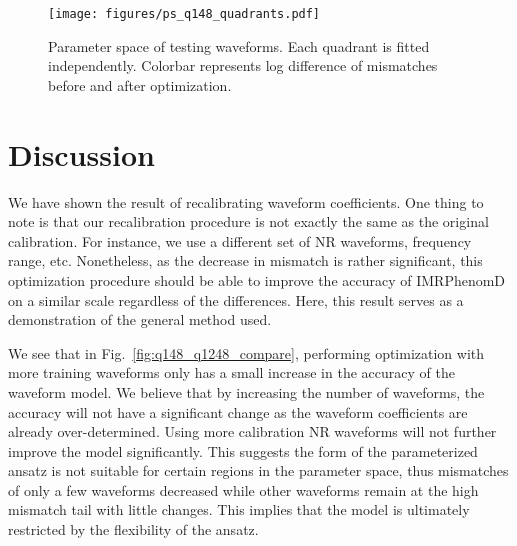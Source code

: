 \documentclass[twocolumn]{aastex631}
\begin{document}
\begin{figure}[t]
	\centering
	\texttt{[image: figures/ps\_q148\_quadrants.pdf]}
	\caption{Parameter space of testing waveforms. Each quadrant is fitted independently. Colorbar represents log difference of mismatches before and after optimization.}
	\label{fig:ps_q148_quadrant}
\end{figure}

\section{Discussion} \label{sec:discussion}


We have shown the result of recalibrating waveform coefficients. One thing to note is that our recalibration procedure is not exactly the same as the original calibration. For instance, we use a different set of NR waveforms, frequency range, etc. Nonetheless, as the decrease in mismatch is rather significant, this optimization procedure should be able to improve the accuracy of IMRPhenomD on a similar scale regardless of the differences. Here, this result serves as a demonstration of the general method used.  

We see that in Fig.~\ref{fig:q148_q1248_compare}, performing optimization with more training waveforms only has a small increase in the accuracy of the waveform model. We believe that by increasing the number of waveforms, the accuracy will not have a significant change as the waveform coefficients are already over-determined. Using more calibration NR waveforms will not further improve the model significantly. This suggests the form of the parameterized ansatz is not suitable for certain regions in the parameter space, thus mismatches of only a few waveforms decreased while other waveforms remain at the high mismatch tail with little changes. This implies that the model is ultimately restricted by the flexibility of the ansatz. 
\end{document}
